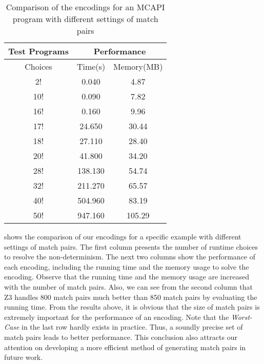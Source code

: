 \begin{table}
\begin{center}
\scriptsize
\begin{tabular}{|c|c|c|}
		\hline
         \multicolumn{1}{|c|}{Test Programs} & \multicolumn{2}{|c|}{Performance} \\ \hline
          Choices &  Time(s) & Memory(MB) \\ \hline
          2! &  0.040 & 4.87 \\
          10! &  0.090 & 7.82 \\
          16! &  0.160 & 9.96 \\
          17! &  24.650 & 30.44 \\
          18! &  27.110 & 28.40 \\
         20! &  41.800 & 34.20 \\
         28! &  138.130 & 54.74 \\
         32! &  211.270 & 65.57 \\
          40! &  504.960 & 83.19 \\
          50! &  947.160 & 105.29 \\
         \hline
		\end{tabular}
\end{center}
\caption{Comparison of the encodings for an MCAPI program with different settings of match pairs}
\label{table:first}
\end{table}

 shows the comparison of our encodings for a specific example with different settings of match pairs. The first column presents the number of runtime choices to resolve the non-determinism. The next two columns show the performance of each encoding, including the running time and the memory usage to solve the encoding. Observe that the running time and the memory usage are increased with the number of match pairs. Also, we can see from the second column that Z3 handles 800 match pairs much better than 850 match pairs by evaluating the running time. From the results above, it is obvious that the size of match pairs is extremely important for the performance of an encoding. Note that the \textit{Worst-Case} in the last row hardly exists in practice. Thus, a soundly precise set of match pairs leads to better performance. This conclusion also attracts our attention on developing a more efficient method of generating match pairs in future work.



